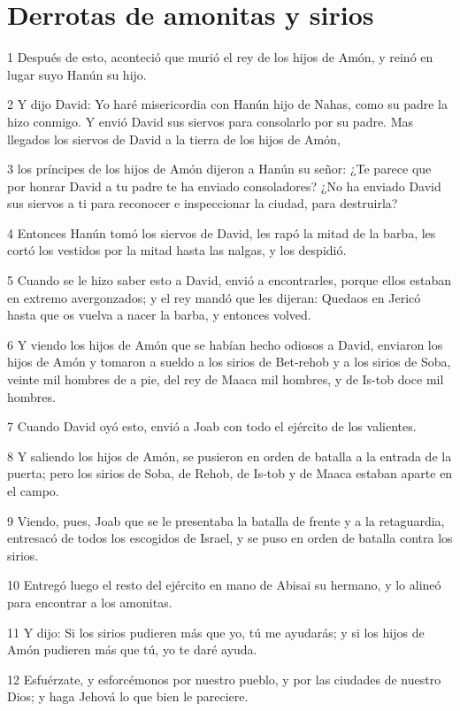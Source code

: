 \section*{Derrotas de amonitas y sirios}

\par 1 Después de esto, aconteció que murió el rey de los hijos de Amón, y reinó en lugar suyo Hanún su hijo.
\par 2 Y dijo David: Yo haré misericordia con Hanún hijo de Nahas, como su padre la hizo conmigo. Y envió David sus siervos para consolarlo por su padre. Mas llegados los siervos de David a la tierra de los hijos de Amón,
\par 3 los príncipes de los hijos de Amón dijeron a Hanún su señor: ¿Te parece que por honrar David a tu padre te ha enviado consoladores? ¿No ha enviado David sus siervos a ti para reconocer e inspeccionar la ciudad, para destruirla?
\par 4 Entonces Hanún tomó los siervos de David, les rapó la mitad de la barba, les cortó los vestidos por la mitad hasta las nalgas, y los despidió.
\par 5 Cuando se le hizo saber esto a David, envió a encontrarles, porque ellos estaban en extremo avergonzados; y el rey mandó que les dijeran: Quedaos en Jericó hasta que os vuelva a nacer la barba, y entonces volved.
\par 6 Y viendo los hijos de Amón que se habían hecho odiosos a David, enviaron los hijos de Amón y tomaron a sueldo a los sirios de Bet-rehob y a los sirios de Soba, veinte mil hombres de a pie, del rey de Maaca mil hombres, y de Is-tob doce mil hombres.
\par 7 Cuando David oyó esto, envió a Joab con todo el ejército de los valientes.
\par 8 Y saliendo los hijos de Amón, se pusieron en orden de batalla a la entrada de la puerta; pero los sirios de Soba, de Rehob, de Is-tob y de Maaca estaban aparte en el campo.
\par 9 Viendo, pues, Joab que se le presentaba la batalla de frente y a la retaguardia, entresacó de todos los escogidos de Israel, y se puso en orden de batalla contra los sirios.
\par 10 Entregó luego el resto del ejército en mano de Abisai su hermano, y lo alineó para encontrar a los amonitas.
\par 11 Y dijo: Si los sirios pudieren más que yo, tú me ayudarás; y si los hijos de Amón pudieren más que tú, yo te daré ayuda.
\par 12 Esfuérzate, y esforcémonos por nuestro pueblo, y por las ciudades de nuestro Dios; y haga Jehová lo que bien le pareciere.
